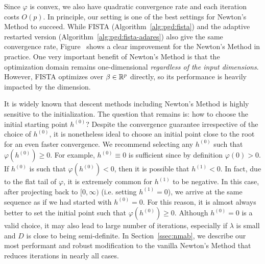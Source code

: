 Since $\varphi$ is convex, we also have quadratic convergence rate and each iteration costs $O(p)$.
In principle, our setting is one of the best settings for Newton's Method to succeed.
While FISTA (Algorithm~\ref{alg:pgd:fista}) and the adaptive restarted version
(Algorithm~\ref{alg:pgd:fista-adares}) also give the same convergence rate,
Figure~ 
shows a clear improvement for the Newton's Method in practice.
One very important benefit of Newton's Method is that the optimization domain
remains one-dimensional \emph{regardless of the input dimensions}.
However, FISTA optimizes over $\beta \in \mathbb{R}^p$ directly, so its performance is heavily
impacted by the dimension.

It is widely known that descent methods including Newton's Method
is highly sensitive to the initialization.
The question that remains is: how to choose the initial starting point $h^{(0)}$?
Despite the convergence guarantee irrespective of the choice of $h^{(0)}$,
it is nonetheless ideal to choose an initial point close to the root for an even faster convergence.
We recommend selecting any $h^{(0)}$ such that $\varphi(h^{(0)}) \geq 0$.
For example, $h^{(0)} \equiv 0$ is sufficient since by definition $\varphi(0) > 0$.
If $h^{(0)}$ is such that $\varphi(h^{(0)}) < 0$,
then it is possible that $h^{(1)} < 0$.
In fact, due to the flat tail of $\varphi$, it is extremely common for $h^{(1)}$ to be negative.
In this case, after projecting back to $[0, \infty)$ (i.e. setting $h^{(1)} = 0$),
we arrive at the same sequence as if we had started with $h^{(0)} = 0$.
For this reason, it is almost always better to 
set the initial point such that $\varphi(h^{(0)}) \geq 0$.
Although $h^{(0)} = 0$ is a valid choice, it may also lead to large number of iterations,
especially if $\lambda$ is small and $D$ is close to being semi-definite.
In Section~\ref{ssec:nmab}, we describe our most performant and robust 
modification to the vanilla Newton's Method that reduces iterations in nearly all cases.
